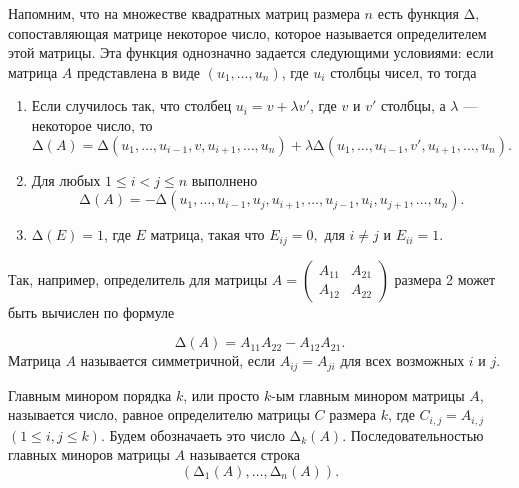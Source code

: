 ﻿\def\mb#1{\mathbb{#1}}
\def\ol#1{\overline{#1}}
\def\tbf#1{\textbf{#1}}

Напомним, что на множестве квадратных матриц размера $n$ есть функция $\text{Δ}$, сопоставляющая матрице некоторое число, которое называется определителем этой матрицы.
Эта функция однозначно задается следующими условиями:
если матрица $A$ представлена в виде $(u_1, \dots, u_n)$, где $u_i$ столбцы чисел, то тогда

\begin{enumerate}
\item  Если случилось так, что столбец $u_i=v + \lambda v'$, где $v$ и $v'$ столбцы, а $\lambda$ --- некоторое число, то
$$\text{Δ}(A)=\text{Δ}(u_1, \dots, u_{i-1}, v, u_{i+1}, \dots, u_n) + \lambda\text{Δ}(u_1, \dots, u_{i-1}, v', u_{i+1}, \dots, u_n).$$
\item  Для любых $1\leq i<j\leq n$ выполнено
$$\text{Δ}(A)=-\text{Δ}(u_1, \dots, u_{i-1}, u_j, u_{i+1}, \dots, u_{j-1}, u_{i}, u_{j+1}, \dots, u_n).$$
\item  $\text{Δ}(E)=1$, где $E$ матрица, такая что $E_{ij}=0, $ для $i\neq j$ и $E_{ii}=1$.
\end{enumerate}
Так, например, определитель для матрицы $A=\left(\begin{smallmatrix}A_{11} & A_{21}\\ A_{12} & A_{22}\end{smallmatrix}\right)$ размера 2 может быть вычислен по формуле

$$\text{Δ}(A)= A_{11}A_{22}-A_{12}A_{21} .$$
Матрица $A$ называется симметричной, если $A_{i j}=A_{j i}$ для всех возможных $i$ и $j$.

Главным минором порядка $k$, или просто $k$-ым главным минором матрицы $A$, называется число, равное определителю матрицы $C$ размера $k$, где $C_{i, j}= A_{i, j}$ $(1 \leq i, j \leq k)$. Будем обозначаеть это число $\text{Δ}_k(A)$. Последовательностью главных миноров матрицы $A$ называется строка
$$(\text{Δ}_1(A), \dots , \text{Δ}_n(A)).$$


